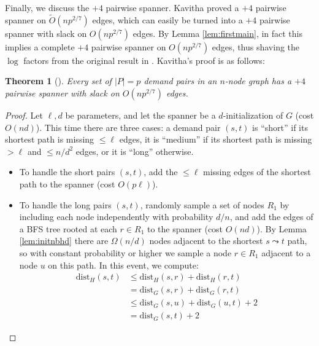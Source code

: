 \documentclass{article}
\newtheorem{theorem}{Theorem}
\newcommand{\dist}{\text{dist}}
\newcommand{\Oish}{\widetilde{O}}
\begin{document}
Finally, we discuss the $+4$ pairwise spanner.
Kavitha \cite{Kavitha17} proved a $+4$ pairwise spanner on $\Oish(np^{2/7})$ edges, which can easily be turned into a $+4$ pairwise spanner with slack on $O(np^{2/7})$ edges.
By Lemma \ref{lem:firstmain}, in fact this implies a complete $+4$ pairwise spanner on $O(np^{2/7})$ edges, thus shaving the $\log$ factors from the original result in \cite{Kavitha17}.
Kavitha's proof is as follows:

\begin{theorem} [\cite{Kavitha17}] \label{thm:fourspan}
Every set of $|P| = p$ demand pairs in an $n$-node graph has a $+4$ pairwise spanner with slack on $O(np^{2/7})$ edges.
\end{theorem}
\begin{proof}
Let $\ell, d$ be parameters, and let the spanner be a $d$-initialization of $G$ (cost $O(nd)$).
This time there are three cases: a demand pair $(s, t)$ is ``short'' if its shortest path is missing $\le \ell$ edges, it is ``medium'' if its shortest path is missing $>\ell$ and $\le n/d^2$ edges, or it is ``long'' otherwise.
\begin{itemize}
\item To handle the short pairs $(s, t)$, add the $\le \ell$ missing edges of the shortest path to the spanner (cost $O(p \ell)$).

\item To handle the long pairs $(s, t)$, randomly sample a set of nodes $R_1$ by including each node independently with probability $d/n$, and add the edges of a BFS tree rooted at each $r \in R_1$ to the spanner (cost $O(nd)$).
By Lemma \ref{lem:initnbhd} there are $\Omega(n/d)$ nodes adjacent to the shortest $s \leadsto t$ path, so with constant probability or higher we sample a node $r \in R_1$ adjacent to a node $u$ on this path.
In this event, we compute:
\begin{align*}
\dist_H(s, t) &\le \dist_H(s, r) + \dist_H(r, t) \tag*{triangle inequality}\\
&= \dist_G(s, r) + \dist_G(r, t) \tag*{shortest path tree}\\
&\le \dist_G(s, u) + \dist_G(u, t) + 2 \tag*{triangle inequality}\\
&= \dist_G(s, t) + 2 \tag*{$u$ on a shortest $s \leadsto t$ path.}
\end{align*}



\end{itemize}
\end{proof}
\end{document}
